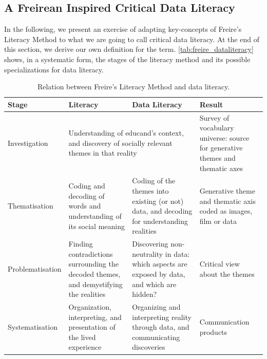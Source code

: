 \subsection{A Freirean Inspired Critical Data Literacy}
\label{sec:freirean_dl}
In the following, we present an exercise of adapting key-concepts of Freire's Literacy Method to what we are going to call critical data literacy. At the end of this section, we derive our own definition for the term. \autoref{tab:freire_dataliteracy} shows, in a systematic form, the stages of the literacy method and its possible specializations for data literacy.

\begin{table}[h]
\ABNTEXfontereduzida
\centering
\caption{Relation between Freire's Literacy Method and data literacy.}
\renewcommand{\arraystretch}{1.5}%
\label{tab:freire_dataliteracy}
\begin{tabular}{|p{2.5cm}|p{3.6cm}|p{3.6cm}|p{3.6cm}|}
\hline
\textbf{Stage}   & \textbf{Literacy} & \textbf{Data Literacy} & \textbf{Result} \\ \hline
Investigation&
\multicolumn{2}{p{7.2cm}|}{Understanding of educand's context, and discovery of socially relevant themes in that reality}
&Survey of vocabulary universe: source for generative themes and thematic axes \\ \hline

Thematisation&Coding and decoding of words and understanding of its social meaning&Coding of the themes into existing (or not) data, and decoding for understanding realities&Generative theme and thematic axis coded as images, film or data \\ \hline

Problematisation&Finding contradictions surrounding the decoded themes, and demystifying the realities&Discovering non-neutrality in data: which aspects are exposed by data, and which are hidden?&Critical view about the themes \\ \hline

Systematisation&Organization, interpreting, and presentation of the lived experience&Organizing and interpreting reality through data, and communicating discoveries&Communication products \\ \hline

\end{tabular}
\end{table}

